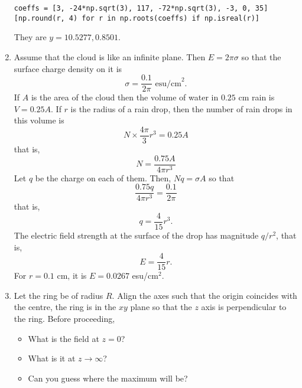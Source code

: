 \documentclass{article}
\begin{document}
\begin{enumerate}
\begin{verbatim}
coeffs = [3, -24*np.sqrt(3), 117, -72*np.sqrt(3), -3, 0, 35]
[np.round(r, 4) for r in np.roots(coeffs) if np.isreal(r)]
\end{verbatim}
They are $y = 10.5277, 0.8501$.

\item Assume that the cloud is like an infinite plane. Then $E = 2\pi\sigma$ so
that the surface charge density on it is
\[
\sigma = \frac{0.1}{2\pi}\text{ esu/cm}^{2}.
\]
If $A$ is the area of the cloud then the volume of water in $0.25$ cm rain is
$V = 0.25A$. If $r$ is the radius of a rain drop, then the number of rain drops
in this volume is
\begin{equation}\label{e19}
N\times \frac{4\pi}{3}r^3 = 0.25A
\end{equation}
that is,
\begin{equation}\label{e20}
N = \frac{0.75A}{4\pi r^3}
\end{equation}
Let $q$ be the charge on each of them. Then, $Nq = \sigma A$ so that
\begin{equation}\label{e21}
\frac{0.75q}{4\pi r^3} = \frac{0.1}{2\pi}
\end{equation}
that is,
\begin{equation}\label{e22}
q = \frac{4}{15}r^3.
\end{equation}
The electric field strength at the surface of the drop has magnitude $q/r^2$, that
is,
\begin{equation}\label{e23}
E = \frac{4}{15}r.
\end{equation}
For $r = 0.1$ cm, it is $E = 0.0267$ esu/cm$^2$.

\item Let the ring be of radius $R$. Align the axes such that the origin coincides
with the centre, the ring is in the $xy$ plane so that the $z$ axis is perpendicular
to the ring. Before proceeding, 
\begin{itemize}
\item What is the field at $z = 0$?
\item What is it at $z \rightarrow \infty$?
\item Can you guess where the maximum will be?
\end{itemize}


\end{enumerate}
\end{document}
